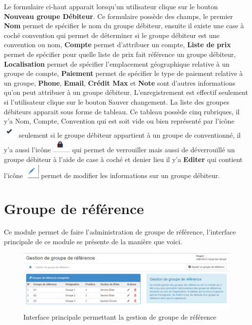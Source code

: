 \documentclass[12pt,a4paper]{report}
\begin{document}
Le formulaire ci-haut apparait lorsqu'un utilisateur clique sur le bouton \textbf{Nouveau groupe Débiteur}. Ce formulaire possède des champs, le premier \textbf{Nom} permet de spécifier le nom du groupe débiteur, ensuite il existe une case à coché convention qui permet de déterminer si le groupe débiteur est une convention ou nom, \textbf{Compte }permet d'attribuer un compte, \textbf{Liste de prix}  permet de spécifier pour quelle liste de prix fait référence un groupe débiteur, \textbf{Localisation} permet de spécifier l'emplacement géographique relative à un groupe de compte, \textbf{Paiement} permet de spécifier le type de paiement relative à un groupe,\textbf{ Phone}, \textbf{Email}, \textbf{Crédit Max }et \textbf{Note} sont d'autres informations qu'on peut attribuer à un groupe débiteur.
L'enregistrement est effectif seulement si l'utilisateur clique sur le bouton Sauver changement.
La liste des groupes débiteurs apparait sous forme de tableau. Ce tableau possède cinq rubriques, il y'a Nom, Compte, Convention qui est soit vide ou bien représenté par l'icône \includegraphics[scale=0.7]{pic/IconOk.png}  seulement si le groupe débiteur appartient à un groupe de conventionné,  il y'a aussi l'icône \includegraphics[scale=0.7]{pic/Locked.png}  qui permet de verrouiller mais aussi de déverrouillé un groupe débiteur à l'aide de case à coché et denier lieu il y'a \textbf{Editer} qui contient l'icône \includegraphics[scale=0.7]{pic/EditUser.png}   permet de modifier les informations sur un groupe débiteur.

\newpage
\section{Groupe de référence}
Ce module permet de faire l'administration de groupe de référence, l'interface principale de ce module se présente de la manière que voici.

\begin{figure}[h]
\begin{center}
\includegraphics[width=14cm]{pic/GestGrREF.png}
\end{center}
\caption{Interface principale permettant la gestion de groupe de référence}
\label{Interface principale permettant la gestion de groupe de référence}
\end{figure}
\end{document}
